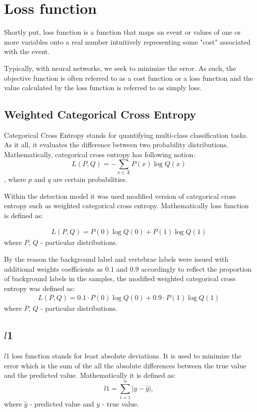 \section{Loss function}
Shortly put, loss function is a function that maps an event or values of one or more variables onto a real number intuitively representing some "cost" associated with the event. 

Typically, with neural networks, we seek to minimize the error. As such, the objective function is often referred to as a cost function or a loss function and the value calculated by the loss function is referred to as simply loss.

\subsection{Weighted Categorical Cross Entropy}
Categorical Cross Entropy stands for quantifying multi-class classification tasks. As it all, it evaluates the difference between two probability distributions. Mathematically, categorical cross entropy has following notion: 
\[
L(P, Q) = - \sum_{x \in X} P(x) \log Q(x) \], where $p$ and $q$ are certain probabilities. 

Within the detection model it was used modified version of categorical cross entropy such as weighted categorical cross entropy. Mathematically loss function is defined as:

\begin{align*}
 L(P, Q) = P(0)\log Q(0) + P(1)\log Q(1)
\end{align*}
where $P$, $Q$ - particular distributions. 

By the reason the background label and vertebrae labels were issued with additional weights coefficients as $0.1$ and $0.9$ accordingly to reflect the proportion of background labels in the samples, the modified weighted categorical cross entropy was defined as:
\begin{align*}
 L(P, Q) = 0.1 \cdot P(0)\log Q(0) + 0.9 \cdot P(1)\log Q(1)
\end{align*}
where $P$, $Q$ - particular distributions.  

\subsection{$l$1}
$l$1 loss function stands for least absolute deviations. It is used to minimize the error which is the sum of the all the absolute differences between the true value and the predicted value. Mathematically it is defined as: 
\[ \text{$l$1} = \sum_{i=1}^n |y - \hat{y}| , \]
where $\hat{y}$ - predicted value and $y$ - true value.

